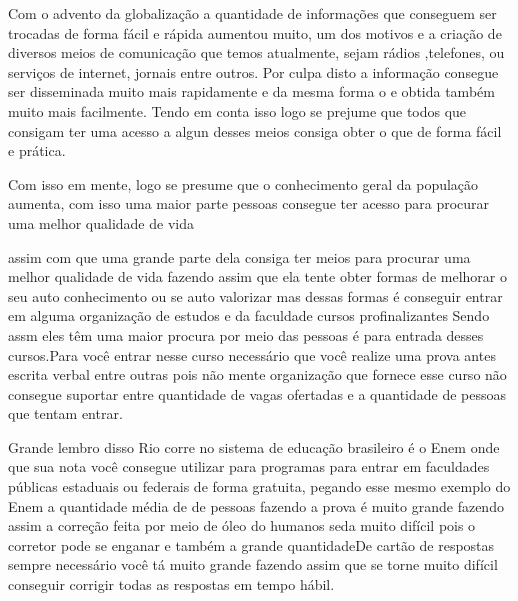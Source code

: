 


Com o advento da globalização a quantidade de informações que conseguem ser trocadas de forma fácil e rápida aumentou muito, um  dos motivos e a criação de  diversos meios de comunicação que temos atualmente, sejam rádios ,telefones, ou serviços de internet, jornais  entre outros. Por culpa disto a informação consegue ser disseminada muito mais rapidamente e da mesma forma o e obtida também muito mais facilmente. Tendo em conta isso logo se prejume que todos que consigam ter uma acesso a algun desses meios consiga obter o que de forma fácil e prática.

Com isso em mente, logo se presume que o conhecimento geral da população aumenta, com isso  uma maior parte pessoas consegue ter acesso para procurar uma melhor qualidade de vida

assim com que uma grande parte dela consiga ter meios para procurar uma melhor qualidade de vida fazendo assim que ela tente obter formas de melhorar o seu auto conhecimento ou se auto valorizar mas dessas formas é conseguir entrar em alguma organização de estudos e da faculdade cursos profinalizantes Sendo assm eles têm uma maior procura por meio das pessoas é para entrada desses cursos.Para você entrar nesse curso necessário que você realize uma prova antes escrita verbal entre outras pois não mente organização que fornece esse curso não consegue suportar entre quantidade de vagas ofertadas e a quantidade de pessoas que tentam entrar.

Grande lembro disso Rio corre no sistema de educação brasileiro é o Enem onde que sua nota você consegue utilizar para programas para entrar em faculdades públicas estaduais ou federais de forma gratuita, pegando esse mesmo exemplo do Enem a quantidade média de de pessoas fazendo a prova é muito grande fazendo assim a correção feita por meio de óleo do humanos seda muito difícil pois o corretor pode se enganar e também a grande quantidadeDe cartão de respostas sempre necessário você tá muito grande fazendo assim que se torne muito difícil conseguir corrigir todas as respostas em tempo hábil.

